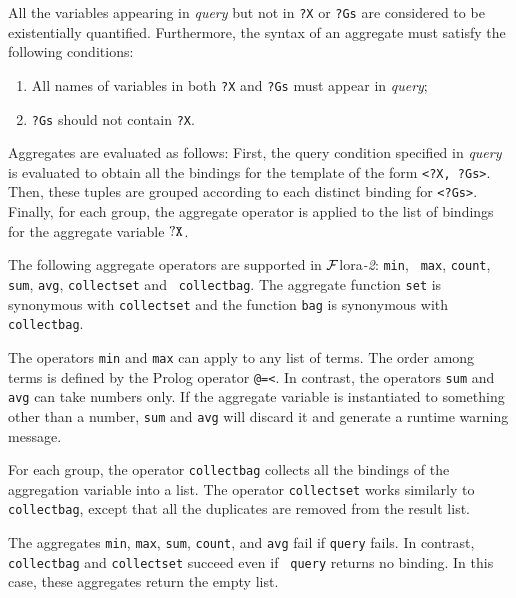 \documentclass[11pt]{article}
\newcommand{\FLORA}{{\mbox{\sc ${\cal F}${lora}\rm\emph{-2}}}\xspace}
\begin{document}
All the variables appearing in {\it query} but not in {\tt ?X} or {\tt ?Gs} are
considered to be existentially quantified. Furthermore, the syntax of an
aggregate must satisfy the following conditions:
\begin{enumerate}
\item All names of variables in both {\tt ?X} and {\tt ?Gs} must
appear in {\it query};
\item {\tt ?Gs} should not contain {\tt ?X}.
\end{enumerate}

Aggregates are evaluated as follows: First, the query
condition specified in {\it query} is evaluated to obtain all the bindings
for the template of the form {\tt \texttt{<}?X, ?Gs\texttt{>}}. Then, these
tuples are grouped according to each distinct binding for
{\tt \texttt{<}?Gs\texttt{>}}. Finally, for each group, the aggregate operator
is applied to the list of bindings for the aggregate variable $\tt ?X$.


%
The following aggregate operators are supported in \FLORA: {\tt min}, {\tt
  max}, {\tt count}, {\tt sum}, {\tt avg}, {\tt collectset} and {\tt
  collectbag}. The aggregate function {\tt set} is synonymous with
{\tt collectset} and the function {\tt bag} is synonymous with {\tt
  collectbag}.

The operators {\tt min} and {\tt max} can apply to any list of
terms. The order among terms is defined by the Prolog operator {\tt @=<}.  In
contrast, the operators {\tt sum} and {\tt avg} can take numbers only. If
the aggregate variable is instantiated to something other than a
number, {\tt sum} and {\tt avg} will discard it and generate a runtime
warning message.

For each group, the operator {\tt collectbag} collects all the bindings of
the aggregation variable into a list. The operator {\tt collectset} works
similarly to {\tt collectbag}, except that all the duplicates are removed
from the result list.


The aggregates {\tt min}, {\tt max}, {\tt sum}, {\tt count}, and {\tt avg}
fail if {\tt query} fails.
In contrast, {\tt collectbag} and {\tt collectset} succeed even if {\tt
  query} returns no binding. In this case, these aggregates return the
empty list.
\end{document}
